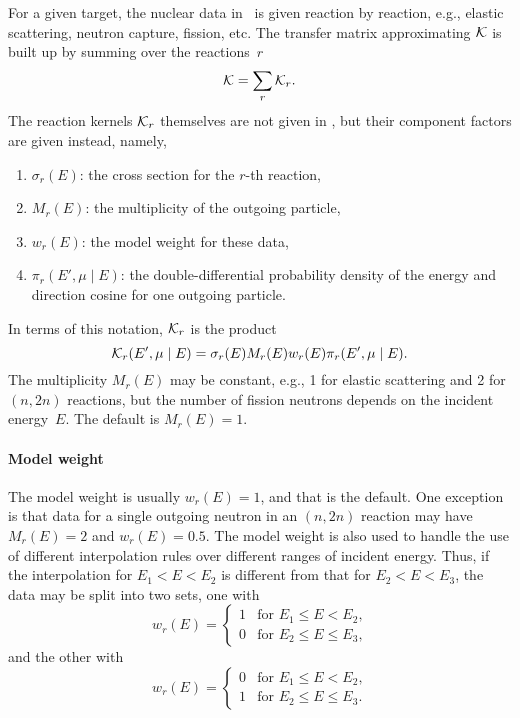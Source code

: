For a given target,
the nuclear data in \xendl\ is given reaction by reaction,
e.g., elastic scattering, neutron capture, fission, etc.
The transfer matrix approximating ${\cal K}$ is built
up by summing over the reactions~$r$
$$
  {\cal K} = \sum_r {\cal K}_r.
$$
The reaction kernels ${\cal K}_r$ themselves are not given in \xendl,
but their component factors are given instead, namely,
\begin{enumerate}
 \item $\sigma_r(E)$: the cross section for the $r$-th reaction,
 \item  $M_r(E)$: the multiplicity of the outgoing particle,
 \item $w_r(E)$: the model weight for these data,
 \item $\pi_r(E', \mu \mid E)$: the double-differential probability
density of the energy and direction cosine
for one outgoing particle. 
\end{enumerate}
In terms of this notation, ${\cal K}_r$ is the product
\begin{equation}
  {\cal K}_r(E', \mu \mid E) = \sigma_r(E) M_r(E) w_r(E) \pi_r(E', \mu \mid E).
  \label{def_pi}
\end{equation}
The multiplicity $M_r(E)$ may be constant, e.g., 1 for elastic scattering
and 2 for $(n, 2n)$ reactions, but the number of fission neutrons
depends on the incident energy~$E$.  The default is $M_r(E) = 1$.

\paragraph{Model weight}\label{Sec:model-weight}
The model weight is usually $w_r(E) = 1$, and that is the
default.  One exception is that data for a single outgoing neutron in
an $(n, 2n)$ reaction may have $M_r(E) = 2$ and $w_r(E) = 0.5$.
The model weight is also used to handle the use of different interpolation
rules over different ranges of incident energy.  Thus, if the interpolation
for $E_1 < E < E_2$ is different from that for $E_2 < E < E_3$,
the data may be split into two sets, one with
$$
  w_r(E) = \begin{cases}
    1 & \text{for $E_1 \le E < E_2$,}\\
    0 & \text{for $E_2 \le E \le E_3$,}
  \end{cases}
$$
and the other with
$$
  w_r(E) = \begin{cases}
    0 & \text{for $E_1 \le E < E_2$,}\\
    1 & \text{for $E_2 \le E \le E_3$.}
  \end{cases}
$$


